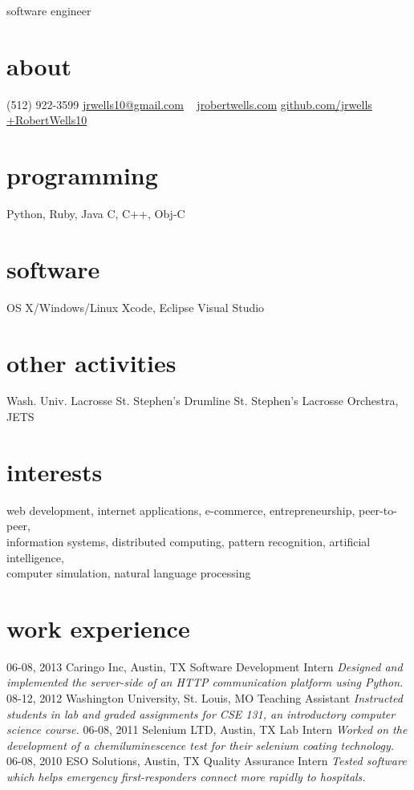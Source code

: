 \documentclass[]{cv}
\begin{document}
       {software engineer}

\begin{aside}
  \section{about}
    (512) 922-3599
    \href{mailto:jrwells10@gmail.com}{jrwells10@gmail.com}
    ~
    \href{http://jrobertwells.com}{jrobertwells.com}
    \href{http://github.com/jrwells}{github.com/jrwells}
    \href{http://google.com/+RobertWells10}{+RobertWells10}
  \section{programming}
    Python, Ruby, Java
    C, C++, Obj-C
  \section{software}
    OS X/Windows/Linux
    Xcode, Eclipse
    Visual Studio
  \section{other activities}
    Wash. Univ. Lacrosse
    St. Stephen's Drumline
    St. Stephen's Lacrosse
    Orchestra, JETS
\end{aside}

\section{interests}

web development, internet applications, e-commerce, entrepreneurship, peer-to-peer, \\
information systems, distributed computing, pattern recognition, artificial intelligence, \\
computer simulation, natural language processing

\section{work experience}

\begin{entrylist}
  \entry
    {06-08, 2013}
    {Caringo Inc, Austin, TX}
    {Software Development Intern}
    {\emph{Designed and implemented the server-side of an HTTP communication platform using Python.}}
  \entry
    {08-12, 2012}
    {Washington University, St. Louis, MO}
    {Teaching Assistant}
    {\emph{Instructed students in lab and graded assignments for CSE 131, an introductory computer science course.}}
  \entry
    {06-08, 2011}
    {Selenium LTD, Austin, TX}
    {Lab Intern}
    {\emph{Worked on the development of a chemiluminescence test for their selenium coating technology.}}
  \entry
    {06-08, 2010}
    {ESO Solutions, Austin, TX}
    {Quality Assurance Intern}
    {\emph{Tested software which helps emergency first-responders connect more rapidly to hospitals.}}
\end{entrylist}
\end{document}

